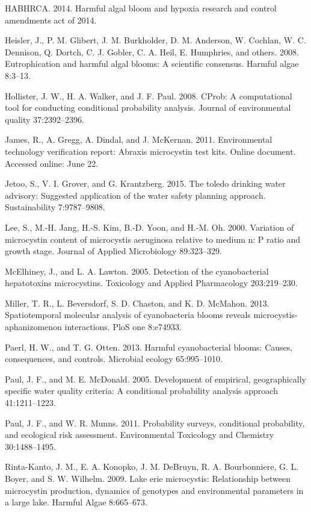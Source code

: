 \documentclass[11pt,]{article}
\begin{document}
HABHRCA. 2014. Harmful algal bloom and hypoxia research and control
amendments act of 2014.

Heisler, J., P. M. Glibert, J. M. Burkholder, D. M. Anderson, W.
Cochlan, W. C. Dennison, Q. Dortch, C. J. Gobler, C. A. Heil, E.
Humphries, and others. 2008. Eutrophication and harmful algal blooms: A
scientific consensus. Harmful algae 8:3--13.

Hollister, J. W., H. A. Walker, and J. F. Paul. 2008. CProb: A
computational tool for conducting conditional probability analysis.
Journal of environmental quality 37:2392--2396.

James, R., A. Gregg, A. Dindal, and J. McKernan. 2011. Environmental
technology verification report: Abraxis microcystin test kits. Online
document. Accessed online: June 22.

Jetoo, S., V. I. Grover, and G. Krantzberg. 2015. The toledo drinking
water advisory: Suggested application of the water safety planning
approach. Sustainability 7:9787--9808.

Lee, S., M.-H. Jang, H.-S. Kim, B.-D. Yoon, and H.-M. Oh. 2000.
Variation of microcystin content of microcystis aeruginosa relative to
medium n: P ratio and growth stage. Journal of Applied Microbiology
89:323--329.

McElhiney, J., and L. A. Lawton. 2005. Detection of the cyanobacterial
hepatotoxins microcystins. Toxicology and Applied Pharmacology
203:219--230.

Miller, T. R., L. Beversdorf, S. D. Chaston, and K. D. McMahon. 2013.
Spatiotemporal molecular analysis of cyanobacteria blooms reveals
microcystis-aphanizomenon interactions. PloS one 8:e74933.

Paerl, H. W., and T. G. Otten. 2013. Harmful cyanobacterial blooms:
Causes, consequences, and controls. Microbial ecology 65:995--1010.

Paul, J. F., and M. E. McDonald. 2005. Development of empirical,
geographically specific water quality criteria: A conditional
probability analysis approach 41:1211--1223.

Paul, J. F., and W. R. Munns. 2011. Probability surveys, conditional
probability, and ecological risk assessment. Environmental Toxicology
and Chemistry 30:1488--1495.

Rinta-Kanto, J. M., E. A. Konopko, J. M. DeBruyn, R. A. Bourbonniere, G.
L. Boyer, and S. W. Wilhelm. 2009. Lake erie microcystis: Relationship
between microcystin production, dynamics of genotypes and environmental
parameters in a large lake. Harmful Algae 8:665--673.
\end{document}
